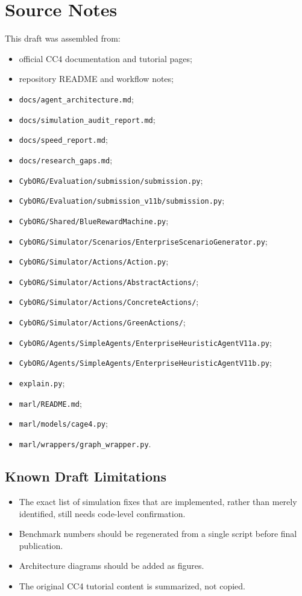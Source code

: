 \section{Source Notes}

This draft was assembled from:

\begin{itemize}
  \item official CC4 documentation and tutorial pages;
  \item repository README and workflow notes;
  \item \texttt{docs/agent\_architecture.md};
  \item \texttt{docs/simulation\_audit\_report.md};
  \item \texttt{docs/speed\_report.md};
  \item \texttt{docs/research\_gaps.md};
  \item \texttt{CybORG/Evaluation/submission/submission.py};
  \item \texttt{CybORG/Evaluation/submission\_v11b/submission.py};
  \item \texttt{CybORG/Shared/BlueRewardMachine.py};
  \item \texttt{CybORG/Simulator/Scenarios/EnterpriseScenarioGenerator.py};
  \item \texttt{CybORG/Simulator/Actions/Action.py};
  \item \texttt{CybORG/Simulator/Actions/AbstractActions/};
  \item \texttt{CybORG/Simulator/Actions/ConcreteActions/};
  \item \texttt{CybORG/Simulator/Actions/GreenActions/};
  \item \texttt{CybORG/Agents/SimpleAgents/EnterpriseHeuristicAgentV11a.py};
  \item \texttt{CybORG/Agents/SimpleAgents/EnterpriseHeuristicAgentV11b.py};
  \item \texttt{explain.py};
  \item \texttt{marl/README.md};
  \item \texttt{marl/models/cage4.py};
  \item \texttt{marl/wrappers/graph\_wrapper.py}.
\end{itemize}

\subsection{Known Draft Limitations}

\begin{itemize}
  \item The exact list of simulation fixes that are implemented, rather than merely identified, still needs code-level confirmation.
  \item Benchmark numbers should be regenerated from a single script before final publication.
  \item Architecture diagrams should be added as figures.
  \item The original CC4 tutorial content is summarized, not copied.
\end{itemize}
